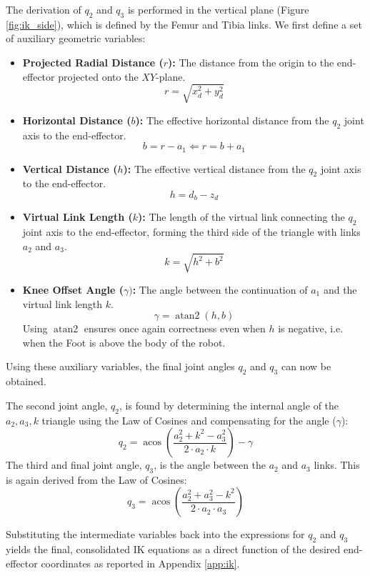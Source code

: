 The derivation of $q_2$ and $q_3$ is performed in the vertical plane (Figure \ref{fig:ik_side}),
which is defined by the Femur and Tibia links. We first define a set of auxiliary geometric variables:
\begin{itemize}
    \item \textbf{Projected Radial Distance ($r$):} The distance from the origin to the end-effector projected
        onto the $XY$-plane.
        \begin{equation*}
            r = \sqrt{x_d^2 + y_d^2}
        \end{equation*}
    \item \textbf{Horizontal Distance ($b$):} The effective horizontal distance from the $q_2$ joint axis to
        the end-effector.
        \begin{equation*}
            b = r - a_1 \Leftarrow r = b + a_1
        \end{equation*}
    \item \textbf{Vertical Distance ($h$):} The effective vertical distance from the $q_2$ joint axis to
        the end-effector.
        \begin{equation*}
            h = d_b - z_d
        \end{equation*}
    \item \textbf{Virtual Link Length ($k$):} The length of the virtual link connecting the $q_2$ joint axis
        to the end-effector, forming the third side of the triangle with links $a_2$ and $a_3$.
        \begin{equation*}
            k = \sqrt{h^2 + b^2}
        \end{equation*}
    \item \textbf{Knee Offset Angle ($\gamma)$:} The angle between the continuation of $a_1$ and the
        virtual link length $k$.
        \begin{equation*}
            \gamma = \operatorname{atan2}(h, b)
        \end{equation*}
        Using $\operatorname{atan2}$ ensures once again correctness even when $h$ is negative, i.e. when the
        Foot is above the body of the robot.
\end{itemize}

Using these auxiliary variables, the final joint angles $q_2$ and $q_3$ can now be obtained.

The second joint angle, $q_2$, is found by determining the internal angle of the $a_2, a_3, k$ triangle
using the Law of Cosines and compensating for the angle ($\gamma$):
\begin{equation*}
    q_2 = \operatorname{acos}\left(\frac{a_2^2 + k^2 - a_3^2}{2 \cdot a_2 \cdot k}\right) - \gamma
\end{equation*}
The third and final joint angle, $q_3$, is the angle between the $a_2$ and $a_3$ links. This is again derived
from the Law of Cosines:
\begin{equation*}
    q_3 = \operatorname{acos}\left(\frac{a_2^2 + a_3^2 - k^2}{2 \cdot a_2 \cdot a_3}\right)
\end{equation*}

Substituting the intermediate variables back into the expressions for $q_2$ and $q_3$ yields the final,
consolidated IK equations as a direct function of the desired end-effector coordinates as reported in Appendix
\ref{app:ik}.
